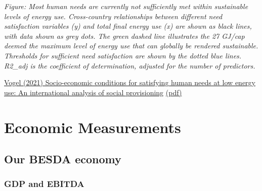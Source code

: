 \documentclass[
]{book}
\begin{document}
\emph{Figure: Most human needs are currently not sufficiently met within sustainable levels of energy use. Cross-country relationships between different need satisfaction
variables (y) and total final energy use (x) are shown as black lines, with data shown as grey dots. The green dashed line illustrates the 27 GJ/cap deemed the
maximum level of energy use that can globally be rendered sustainable. Thresholds for sufficient need satisfaction are shown by the dotted blue
lines. R2\_adj is the coefficient of determination, adjusted for the number of predictors.}

\href{https://www.sciencedirect.com/science/article/pii/S0959378021000662}{Vogel (2021) Socio-economic conditions for satisfying human needs at low energy use: An international analysis of social provisioning}
\href{pdf/Vogel_2021_Social_Provisoning_of_Needs.pdf}{(pdf)}

\hypertarget{economic-measurements}{%
\chapter{Economic Measurements}\label{economic-measurements}}

\hypertarget{our-besda-economy}{%
\section{Our BESDA economy}\label{our-besda-economy}}

\hypertarget{gdp-and-ebitda}{%
\subsection{GDP and EBITDA}\label{gdp-and-ebitda}}
\end{document}
